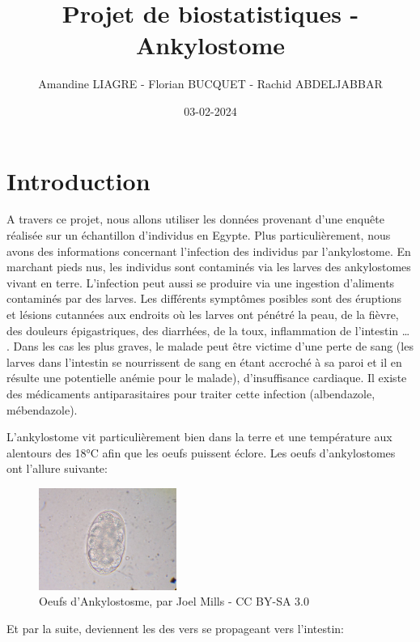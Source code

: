 \documentclass[
]{article}
\title{Projet de biostatistiques - Ankylostome}
\author{Amandine LIAGRE - Florian BUCQUET - Rachid ABDELJABBAR}
\date{03-02-2024}
\begin{document}
\maketitle

{
\setcounter{tocdepth}{3}
\tableofcontents
}
\newpage

\section{Introduction}\label{introduction}

A travers ce projet, nous allons utiliser les données provenant d'une
enquête réalisée sur un échantillon d'individus en Egypte. Plus
particulièrement, nous avons des informations concernant l'infection des
individus par l'ankylostome. En marchant pieds nus, les individus sont
contaminés via les larves des ankylostomes vivant en terre. L'infection
peut aussi se produire via une ingestion d'aliments contaminés par des
larves. Les différents symptômes posibles sont des éruptions et lésions
cutannées aux endroits où les larves ont pénétré la peau, de la fièvre,
des douleurs épigastriques, des diarrhées, de la toux, inflammation de
l'intestin \ldots{} . Dans les cas les plus graves, le malade peut être
victime d'une perte de sang (les larves dans l'intestin se nourrissent
de sang en étant accroché à sa paroi et il en résulte une potentielle
anémie pour le malade), d'insuffisance cardiaque. Il existe des
médicaments antiparasitaires pour traiter cette infection (albendazole,
mébendazole).

L'ankylostome vit particulièrement bien dans la terre et une température
aux alentours des 18°C afin que les oeufs puissent éclore. Les oeufs
d'ankylostomes ont l'allure suivante:

\begin{figure}
\centering
\includegraphics[width=0.4\textwidth,height=\textheight]{egg.png}
\caption{Oeufs d'Ankylostosme, par Joel Mills - CC BY-SA 3.0}
\end{figure}

Et par la suite, deviennent les des vers se propageant vers l'intestin:
\end{document}
